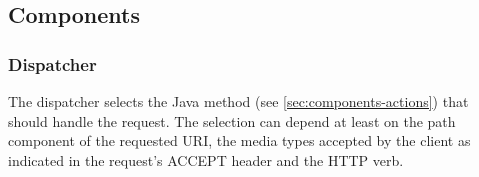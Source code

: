 \documentclass[12pt,a4paper,twoside]{scrartcl}		%
\begin{document}



\subsection{Components}

\subsubsection{Dispatcher}
\label{sec:dispatcher}
The dispatcher selects the Java method (see \ref{sec:components-actions}) that
should handle the request. The selection can depend at least on the path
component of the requested URI, the media types accepted by the client as
indicated in the request's ACCEPT header and the HTTP verb.
\end{document}
